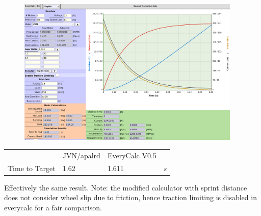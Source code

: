 \documentclass[10pt,letterpaper]{article}
\begin{document}
	\begin{figure}[H]
		\includegraphics[width=0.95\textwidth]{validation/mechanism_EC_C.png}
	\end{figure}

	\begin{table}[H]
	\begin{tabular}{llll}
	                & JVN/apalrd & EveryCalc V0.5 & \\ \cline{1-4} 
	Time to Target  & 1.62  & 1.611 & $s$
	\end{tabular}
	\end{table}

	Effectively the same result. Note: the modified calculator with sprint distance does not consider wheel slip due to friction, hence traction limiting is disabled in everycalc for a fair comparison.
\end{document}

